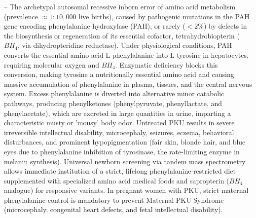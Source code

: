 -- The archetypal autosomal recessive inborn error of amino acid metabolism (prevalence $\approx 1:10,000$ live births), caused by pathogenic mutations in the PAH gene encoding phenylalanine hydroxylase (PAH), or rarely ($<2\%$) by defects in the biosynthesis or regeneration of its essential cofactor, tetrahydrobiopterin ($BH_4$, via dihydropteridine reductase). Under physiological conditions, PAH converts the essential amino acid L-phenylalanine into L-tyrosine in hepatocytes, requiring molecular oxygen and $BH_4$. Enzymatic deficiency blocks this conversion, making tyrosine a nutritionally essential amino acid and causing massive accumulation of phenylalanine in plasma, tissues, and the central nervous system. Excess phenylalanine is diverted into alternative minor catabolic pathways, producing phenylketones (phenylpyruvate, phenyllactate, and phenylacetate), which are excreted in large quantities in urine, imparting a characteristic musty or 'mousy' body odor. Untreated PKU results in severe irreversible intellectual disability, microcephaly, seizures, eczema, behavioral disturbances, and prominent hypopigmentation (fair skin, blonde hair, and blue eyes due to phenylalanine inhibition of tyrosinase, the rate-limiting enzyme in melanin synthesis). Universal newborn screening via tandem mass spectrometry allows immediate institution of a strict, lifelong phenylalanine-restricted diet supplemented with specialized amino acid medical foods and sapropterin ($BH_4$ analogue) for responsive variants. In pregnant women with PKU, strict maternal phenylalanine control is mandatory to prevent Maternal PKU Syndrome (microcephaly, congenital heart defects, and fetal intellectual disability).

